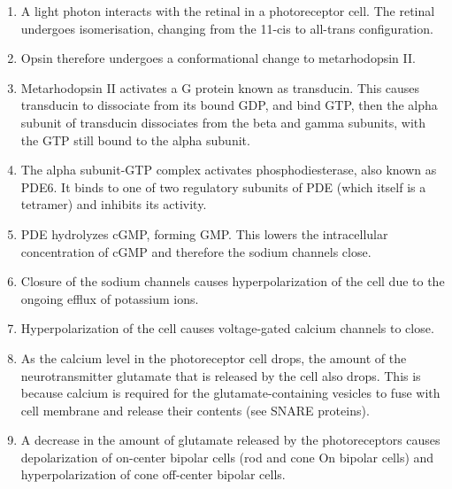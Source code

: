 \documentclass[]{book}
\providecommand{\tightlist}{%
  \setlength{\itemsep}{0pt}\setlength{\parskip}{0pt}}
\begin{document}
\begin{enumerate}
\def\labelenumi{\arabic{enumi}.}
\tightlist
\item
  A light photon interacts with the retinal in a photoreceptor cell. The retinal undergoes isomerisation, changing from the 11-cis to all-trans configuration.
\item
  Opsin therefore undergoes a conformational change to metarhodopsin II.
\item
  Metarhodopsin II activates a G protein known as transducin. This causes transducin to dissociate from its bound GDP, and bind GTP, then the alpha subunit of transducin dissociates from the beta and gamma subunits, with the GTP still bound to the alpha subunit.
\item
  The alpha subunit-GTP complex activates phosphodiesterase, also known as PDE6. It binds to one of two regulatory subunits of PDE (which itself is a tetramer) and inhibits its activity.
\item
  PDE hydrolyzes cGMP, forming GMP. This lowers the intracellular concentration of cGMP and therefore the sodium channels close.
\item
  Closure of the sodium channels causes hyperpolarization of the cell due to the ongoing efflux of potassium ions.
\item
  Hyperpolarization of the cell causes voltage-gated calcium channels to close.
\item
  As the calcium level in the photoreceptor cell drops, the amount of the neurotransmitter glutamate that is released by the cell also drops. This is because calcium is required for the glutamate-containing vesicles to fuse with cell membrane and release their contents (see SNARE proteins).
\item
  A decrease in the amount of glutamate released by the photoreceptors causes depolarization of on-center bipolar cells (rod and cone On bipolar cells) and hyperpolarization of cone off-center bipolar cells.
\end{enumerate}
\end{document}
